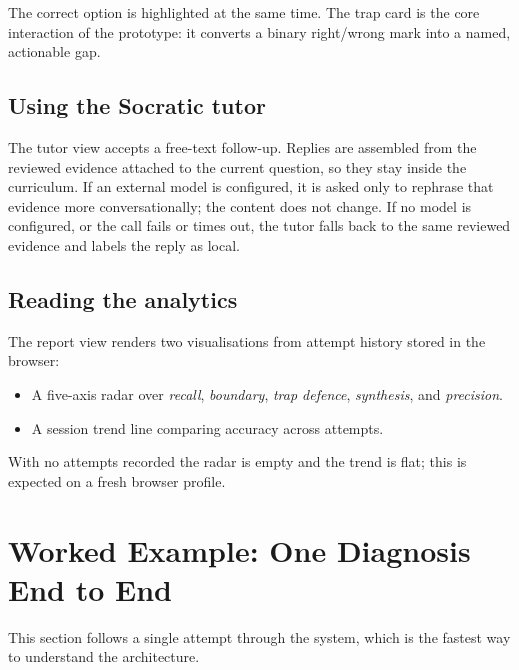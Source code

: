 \documentclass[11pt,a4paper]{article}
\begin{document}
The correct option is highlighted at the same time. The trap card is the core interaction of the prototype:
it converts a binary right/wrong mark into a named, actionable gap.

\subsection{Using the Socratic tutor}

The tutor view accepts a free-text follow-up. Replies are assembled from the reviewed evidence attached to the
current question, so they stay inside the curriculum. If an external model is configured, it is asked only to
rephrase that evidence more conversationally; the content does not change.
If no model is configured, or the call fails or times out, the tutor falls back to the same reviewed evidence and
labels the reply as local.

\subsection{Reading the analytics}

The report view renders two visualisations from attempt history stored in the browser:

\begin{itemize}[leftmargin=1.4em,itemsep=0.15em]
  \item A five-axis radar over \emph{recall}, \emph{boundary}, \emph{trap defence}, \emph{synthesis}, and \emph{precision}.
  \item A session trend line comparing accuracy across attempts.
\end{itemize}

With no attempts recorded the radar is empty and the trend is flat; this is expected on a fresh browser profile.

\section{Worked Example: One Diagnosis End to End}

This section follows a single attempt through the system, which is the fastest way to understand the architecture.
\end{document}
